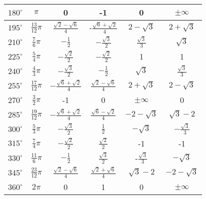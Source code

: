 \begin{tabular}{  | c | c || c | c | c | c | }
    \hline
    $180^{\circ}$     & $\pi$     & 0   &   -1   &  0    &  $\pm\infty$  \\
    \hline
	$195^{\circ}$     & $\frac{13}{12}\pi$   & $\frac{\sqrt{2}-\sqrt{6}}{4}$       &  -$\frac{\sqrt{6}+\sqrt{2}}{4}$     & $2-\sqrt{3}$   & $2+\sqrt{3}$       \\
	\hline
	$210^{\circ}$     & $\frac{7}{6}\pi$     & $-\frac{1}{2}$      &   $-\frac{\sqrt{3}}{2}$     &  $\frac{\sqrt{3}}{3}$    &  $\sqrt{3}$  \\
	\hline
  	$225^{\circ}$     & $\frac{5}{4}\pi$     & $-\frac{\sqrt{2}}{2}$      &   $-\frac{\sqrt{2}}{2}$     &  1    &  1  \\
  	\hline	
  	$240^{\circ}$     & $\frac{4}{3}\pi$     & $-\frac{\sqrt{3}}{2}$      &   $-\frac{1}{2}$     &  $\sqrt{3}$    &  $\frac{\sqrt{3}}{3}$  \\
  	\hline
     $255^{\circ}$     & $\frac{17}{12}\pi$   & $-\frac{\sqrt{6}+\sqrt{2}}{4}$       &  $\frac{\sqrt{2}-\sqrt{6}}{4}$     & $2+\sqrt{3}$   & $2-\sqrt{3}$       \\
     \hline
     $270^{\circ}$     & $\frac{3}{2}\pi$     & -1      &   0    &  $\pm\infty$    &  0  \\
     \hline	
    $285^{\circ}$     & $\frac{19}{12}\pi$   & $-\frac{\sqrt{6}+\sqrt{2}}{4}$       &  $\frac{\sqrt{6}-\sqrt{2}}{4}$     & $-2-\sqrt{3}$   & $\sqrt{3}-2$       \\
    \hline
    $300^{\circ}$     & $\frac{5}{3}\pi$     & $-\frac{\sqrt{3}}{2}$      &   $\frac{1}{2}$     &  $-\sqrt{3}$    &  $-\frac{\sqrt{3}}{3}$  \\
    \hline	
    $315^{\circ}$     & $\frac{7}{4}\pi$     & $-\frac{\sqrt{2}}{2}$      &   $\frac{\sqrt{2}}{2}$     &  -1   &  -1  \\
    \hline	
    $330^{\circ}$     & $\frac{11}{6}\pi$     & $-\frac{1}{2}$      &   $\frac{\sqrt{3}}{2}$     &  -$\frac{\sqrt{3}}{3}$   &  $-\sqrt{3}$  \\
    \hline	
     $345^{\circ}$     & $\frac{23}{12}\pi$     & $\frac{\sqrt{2}-\sqrt{6}}{4}$       &  $\frac{\sqrt{2}+\sqrt{6}}{4}$    &  $\sqrt{3}-2$    &  $-2-\sqrt{3}$  \\
     \hline	
     $360^{\circ}$     & $2\pi$   & 0       &  1     & 0   & $\pm\infty$       \\
     \hline
\end{tabular}
